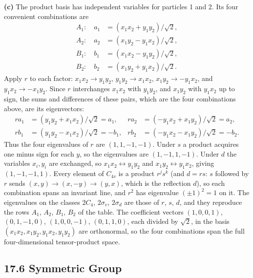 \textbf{(c)} The product basis has independent variables for
particles 1 and 2. Its four convenient combinations are
\[
\boxed{\begin{aligned}
A_1:\quad a_1&=(x_1x_2+y_1y_2)/\sqrt2,\\
A_2:\quad a_2&=(x_1y_2-y_1x_2)/\sqrt2,\\
B_1:\quad b_1&=(x_1x_2-y_1y_2)/\sqrt2,\\
B_2:\quad b_2&=(x_1y_2+y_1x_2)/\sqrt2.
\end{aligned}}
\]
Apply $r$ to each factor: $x_1x_2\to y_1y_2$,
$y_1y_2\to x_1x_2$,
$x_1y_2\to-y_1x_2$, and
$y_1x_2\to-x_1y_2$.
Since $r$ interchanges $x_1x_2$ with $y_1y_2$, and $x_1y_2$ with
$y_1x_2$ up to sign, the sums and differences of these pairs, which
are the four combinations above, are its eigenvectors:
\[
\begin{aligned}
ra_1&=(y_1y_2+x_1x_2)/\sqrt2=a_1,&
ra_2&=(-y_1x_2+x_1y_2)/\sqrt2=a_2,\\
rb_1&=(y_1y_2-x_1x_2)/\sqrt2=-b_1,&
rb_2&=(-y_1x_2-x_1y_2)/\sqrt2=-b_2.
\end{aligned}
\]
Thus the four eigenvalues of $r$ are $(1,1,-1,-1)$.
Under $s$ a product acquires one minus sign for each $y$,
so the eigenvalues are $(1,-1,1,-1)$.
Under $d$ the variables $x_i,y_i$ are exchanged, so
$x_1x_2\leftrightarrow y_1y_2$ and $x_1y_2\leftrightarrow y_1x_2$,
giving $(1,-1,-1,1)$.
Every element of $C_{4v}$ is a product $r^js^k$ (and $d=rs$: $s$
followed by $r$ sends $(x,y)\to(x,-y)\to(y,x)$, which is the
reflection $d$), so each combination spans an invariant line, and
$r^2$ has eigenvalue $(\pm1)^2=1$ on it. The eigenvalues on the
classes $2C_4$, $2\sigma_v$, $2\sigma_d$ are those of $r$, $s$, $d$,
and they reproduce the rows $A_1$, $A_2$, $B_1$, $B_2$ of the table.
The coefficient vectors $(1,0,0,1)$, $(0,1,-1,0)$, $(1,0,0,-1)$,
$(0,1,1,0)$, each divided by $\sqrt2$, in the basis
$(x_1x_2,x_1y_2,y_1x_2,y_1y_2)$ are orthonormal, so the four
combinations span the full four-dimensional tensor-product space.

\subsection*{17.6 Symmetric Group}


